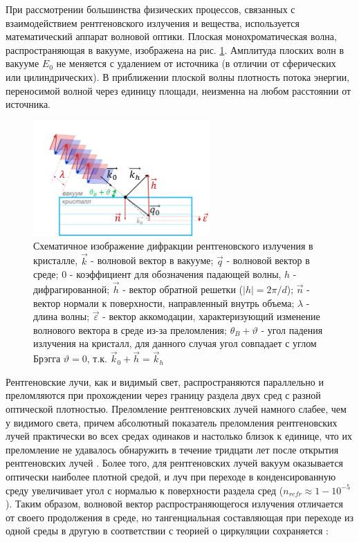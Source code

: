   При рассмотрении большинства физических процессов, связанных с взаимодействием
  рентгеновского излучения и вещества, используется математический аппарат волновой оптики.
  Плоская монохроматическая волна, распространяющая в вакууме, изображена на рис. \ref{ris:plane_wave_vacuum}.
  Амплитуда плоских волн в вакууме $E_0$ не меняется с удалением от
  источника (в отличии от сферических или цилиндрических). В приближении плоской волны
  плотность потока энергии, переносимой волной через единицу площади, неизменна на любом расстоянии от источника.

  \begin{figure}[H]
    \centering
    \includegraphics[width=0.6\textwidth]{images/plane_wave_vacuum.png}
    \caption{Схематичное изображение дифракции рентгеновского излучения в кристалле,
      $\vec {k}$ - волновой вектор в вакууме; $\vec {q}$ - волновой вектор в среде;
     $0$ - коэффициент для обозначения падающей волны, $h$ -  дифрагированной; $\vec{h}$ - вектор
     обратной решетки ($|h|=2\pi/d$); $\vec{n}$ - вектор нормали к поверхности, направленный внутрь объема;
     $\lambda$ - длина волны; $\vec{\varepsilon}$ - вектор аккомодации, характеризующий изменение
     волнового вектора в среде из-за преломления; $\theta_B+\vartheta$ - угол падения излучения на кристалл, для данного
     случая угол совпадает с углом Брэгга $\vartheta = 0$, т.к.  $\vec {k}_0 + \vec{h} = \vec {k}_h $}
    \label{ris:plane_wave_vacuum}
  \end{figure}

Рентгеновские лучи, как и видимый свет, распространяются параллельно и преломляются при
прохождении через границу раздела двух сред с разной оптической плотностью.
 Преломление рентгеновских лучей намного слабее, чем у видимого света, причем
 абсолютный показатель преломления рентгеновских лучей практически во всех средах
одинаков и настолько близок к единице, что их преломление не удавалось обнаружить
 в течение тридцати лет после открытия рентгеновских лучей \cite{fetisov2007}.
 Более того, для рентгеновских лучей вакуум оказывается оптически наиболее плотной средой, и луч
 при переходе в конденсированную среду увеличивает угол с нормалью к поверхности раздела сред ($n_{refr} \approx 1-10^{-5}$).
 Таким образом, волновой вектор распространяющегося излучения отличается от своего продолжения в
 среде, но тангенциальная составляющая при переходе из одной среды в другую в соответствии с теорией о
 циркуляции сохраняется \cite{landau_8_1992}:


